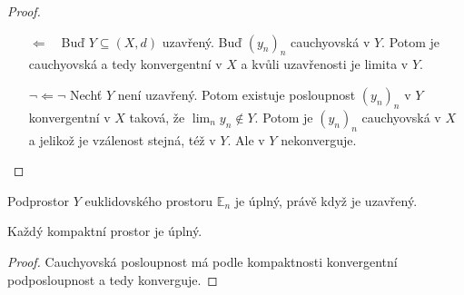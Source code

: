 \documentclass[../main.tex]{subfiles}
\begin{document}
\begin{proof}
	\begin{enumerate}
		\item[$\Leftarrow \phantom{\lnot} $] Buď $Y \subseteq (X,d)$ uzavřený. Buď $(y_n)_n$ cauchyovská v $Y$. Potom je cauchyovská 
	    a tedy konvergentní v $X$ a kvůli uzavřenosti je limita v $Y$.
	    \item[$\lnot \Leftarrow \lnot $] Nechť $Y$ není uzavřený. Potom existuje posloupnost $(y_n)_n$ v $Y$ konvergentní v $X$ taková, že $\lim_n y_n \notin Y$.
	    Potom je $(y_n)_n$ cauchyovská v $X$ a jelikož je vzálenost stejná, též v $Y$. Ale v $Y$ nekonverguje.
	\end{enumerate}
\end{proof}

\begin{consequence}
	Podprostor $Y$ euklidovského prostoru $\mathbb{E}_n$ je úplný, právě když je uzavřený.
\end{consequence}

\begin{lemma}
	Každý kompaktní prostor je úplný.
\end{lemma}

\begin{proof}
	Cauchyovská posloupnost má podle kompaktnosti konvergentní podposloupnost a tedy konverguje.
\end{proof}
\end{document}

